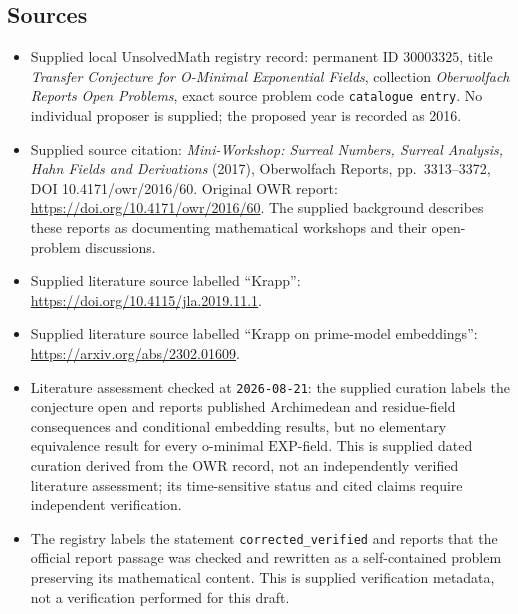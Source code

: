 \documentclass[11pt]{article}
\begin{document}
\subsection{Sources}
\begin{itemize}
\item Supplied local UnsolvedMath registry record: permanent ID \(30003325\), title \emph{Transfer Conjecture for O-Minimal Exponential Fields}, collection \emph{Oberwolfach Reports Open Problems}, exact source problem code \texttt{catalogue entry}. No individual proposer is supplied; the proposed year is recorded as 2016.
\item Supplied source citation: \emph{Mini-Workshop: Surreal Numbers, Surreal Analysis, Hahn Fields and Derivations} (2017), Oberwolfach Reports, pp.\ 3313--3372, DOI 10.4171/owr/2016/60. Original OWR report: \url{https://doi.org/10.4171/owr/2016/60}. The supplied background describes these reports as documenting mathematical workshops and their open-problem discussions.
\item Supplied literature source labelled ``Krapp'': \url{https://doi.org/10.4115/jla.2019.11.1}.
\item Supplied literature source labelled ``Krapp on prime-model embeddings'': \url{https://arxiv.org/abs/2302.01609}.
\item Literature assessment checked at \texttt{2026-08-21}: the supplied curation labels the conjecture open and reports published Archimedean and residue-field consequences and conditional embedding results, but no elementary equivalence result for every o-minimal \(\mathrm{EXP}\)-field. This is supplied dated curation derived from the OWR record, not an independently verified literature assessment; its time-sensitive status and cited claims require independent verification.
\item The registry labels the statement \texttt{corrected\_verified} and reports that the official report passage was checked and rewritten as a self-contained problem preserving its mathematical content. This is supplied verification metadata, not a verification performed for this draft.
\end{itemize}
\end{document}
